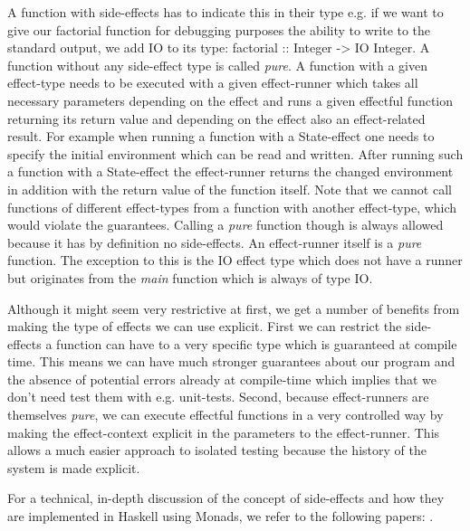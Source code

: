 A function with side-effects has to indicate this in their type e.g. if we want to give our factorial function for debugging purposes the ability to write to the standard output, we add IO to its type: factorial :: Integer -> IO Integer. A function without any side-effect type is called \textit{pure}. A function with a given effect-type needs to be executed with a given effect-runner which takes all necessary parameters depending on the effect and runs a given effectful function returning its return value and depending on the effect also an effect-related result. For example when running a function with a State-effect one needs to specify the initial environment which can be read and written. After running such a function with a State-effect the effect-runner returns the changed environment in addition with the return value of the function itself. Note that we cannot call functions of different effect-types from a function with another effect-type, which would violate the guarantees. Calling a \textit{pure} function though is always allowed because it has by definition no side-effects. An effect-runner itself is a \textit{pure} function. The exception to this is the IO effect type which does not have a runner but originates from the \textit{main} function which is always of type IO.

Although it might seem very restrictive at first, we get a number of benefits from making the type of effects we can use explicit. First we can restrict the side-effects a function can have to a very specific type which is guaranteed at compile time. This means we can have much stronger guarantees about our program and the absence of potential errors already at compile-time which implies that we don't need test them with e.g. unit-tests. Second, because effect-runners are themselves \textit{pure}, we can execute effectful functions in a very controlled way by making the effect-context explicit in the parameters to the effect-runner. This allows a much easier approach to isolated testing because the history of the system is made explicit.

For a technical, in-depth discussion of the concept of side-effects and how they are implemented in Haskell using Monads, we refer to the following papers: \cite{moggi_computational_1989, wadler_essence_1992, wadler_monads_1995, wadler_how_1997, jones_tackling_2002}.


